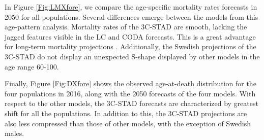 \documentclass[Thesis]{subfiles}
\begin{document}
In Figure \ref{Fig:LMXfore}, we compare the age-specific mortality rates forecasts in 2050 for all populations. Several differences emerge between the models from this age-pattern analysis. Mortality rates of the 3C-STAD are smooth, lacking the jagged features visible in the LC and CODA forecasts. This is a great advantage for long-term mortality projections \citep{li2013extending}. Additionally, the Swedish projections of the 3C-STAD do not display an unexpected S-shape displayed by other models in the age range 60-100. 

Finally, Figure \ref{Fig:DXfore} shows the observed age-at-death distribution for the four populations in 2016, along with the 2050 forecasts of the four models. With respect to the other models, the 3C-STAD forecasts are characterized by greatest shift for all the populations. In addition to this, the 3C-STAD projections are also less compressed than those of other models, with the exception of Swedish males.


\end{document}
